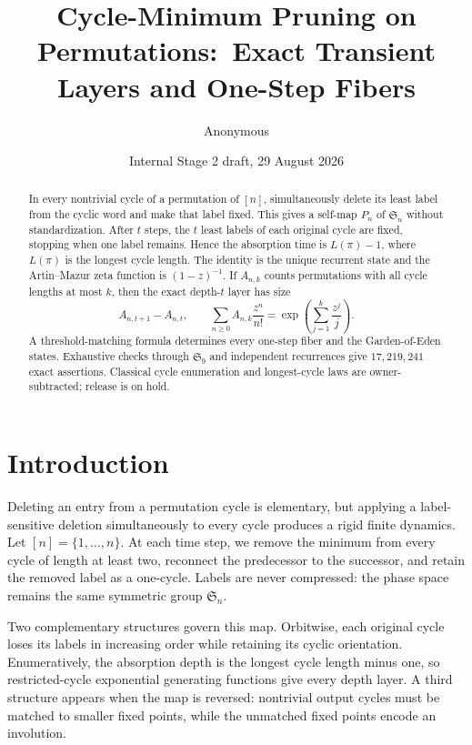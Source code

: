 \documentclass[11pt,a4paper]{amsart}
\title[Cycle-minimum pruning]{Cycle-Minimum Pruning on Permutations:\
Exact Transient Layers and One-Step Fibers}
\author{Anonymous}
\date{Internal Stage 2 draft, 29 August 2026}
\theoremstyle{definition}
\theoremstyle{remark}
\newcommand{\Sn}{\mathfrak S_n}
\begin{document}
\begin{abstract}
In every nontrivial cycle of a permutation of $[n]$, simultaneously delete
its least label from the cyclic word and make that label fixed.  This gives a
self-map $P_n$ of $\mathfrak S_n$ without standardization.  After $t$ steps,
the $t$ least labels of each original cycle are fixed, stopping when one
label remains.  Hence the absorption time is $L(\pi)-1$, where $L(\pi)$ is
the longest cycle length.  The identity is the unique recurrent state and
the Artin--Mazur zeta function is $(1-z)^{-1}$.  If $A_{n,k}$ counts permutations
with all cycle lengths at most $k$, then the exact depth-$t$ layer has size
\[
 A_{n,t+1}-A_{n,t},\qquad
 \sum_{n\geq0}A_{n,k}\frac{z^n}{n!}
 =\exp\!\left(\sum_{j=1}^k\frac{z^j}{j}\right).
\]
A threshold-matching formula determines every one-step fiber and the
Garden-of-Eden states.  Exhaustive checks through $\mathfrak S_9$ and
independent recurrences give $17{,}219{,}241$ exact assertions.  Classical
cycle enumeration and longest-cycle laws are owner-subtracted; release is on
hold.
\end{abstract}

\maketitle

\section{Introduction}

Deleting an entry from a permutation cycle is elementary, but applying a
label-sensitive deletion simultaneously to every cycle produces a rigid
finite dynamics.  Let $[n]=\{1,\ldots,n\}$.  At each time step, we remove the
minimum from every cycle of length at least two, reconnect the predecessor
to the successor, and retain the removed label as a one-cycle.  Labels are
never compressed: the phase space remains the same symmetric group $\Sn$.

Two complementary structures govern this map.  Orbitwise, each original
cycle loses its labels in increasing order while retaining its cyclic
orientation.  Enumeratively, the absorption depth is the longest cycle
length minus one, so restricted-cycle exponential generating functions give
every depth layer.  A third structure appears when the map is reversed:
nontrivial output cycles must be matched to smaller fixed points, while the
unmatched fixed points encode an involution.
\end{document}

